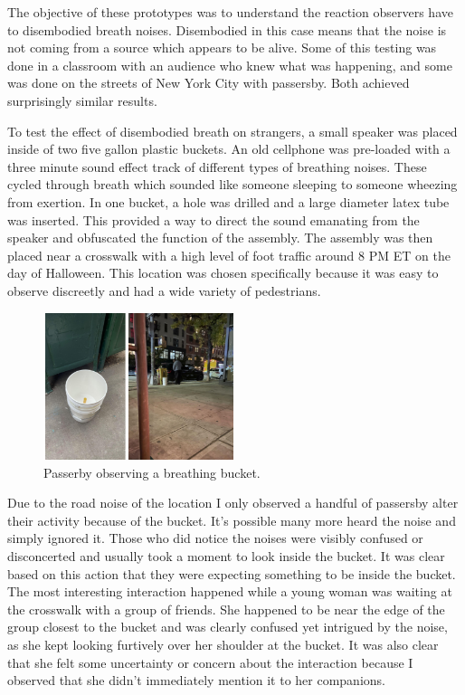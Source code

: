 \documentclass[letterpaper]{article}
\begin{document}
The objective of these prototypes was to understand the reaction observers have to disembodied breath noises. Disembodied in this case means that the noise is not coming from a source which appears to be alive. Some of this testing was done in a classroom with an audience who knew what was happening, and some was done on the streets of New York City with passersby. Both achieved surprisingly similar results. 

To test the effect of disembodied breath on strangers, a small speaker was placed inside of two five gallon plastic buckets. An old cellphone was pre-loaded with a three minute sound effect track of different types of breathing noises. These cycled through breath which sounded like someone sleeping to someone wheezing from exertion. In one bucket, a hole was drilled and a large diameter latex tube was inserted. This provided a way to direct the sound emanating from the speaker and obfuscated the function of the assembly. The assembly was then placed near a crosswalk with a high level of foot traffic around 8 PM ET on the day of Halloween. This location was chosen specifically because it was easy to observe discreetly and had a wide variety of pedestrians. 

\begin{figure}[h]
\includegraphics[width=0.5\textwidth]{images/buckettest.png}
\caption{Passerby observing a breathing bucket.}
\end{figure}

Due to the road noise of the location I only observed a handful of passersby alter their activity because of the bucket. It's possible many more heard the noise and simply ignored it. Those who did notice the noises were visibly confused or disconcerted and usually took a moment to look inside the bucket. It was clear based on this action that they were expecting something to be inside the bucket. The most interesting interaction happened while a young woman was waiting at the crosswalk with a group of friends. She happened to be near the edge of the group closest to the bucket and was clearly confused yet intrigued by the noise, as she kept looking furtively over her shoulder at the bucket. It was also clear that she felt some uncertainty or concern about the interaction because I observed that she didn’t immediately mention it to her companions.
\end{document}
